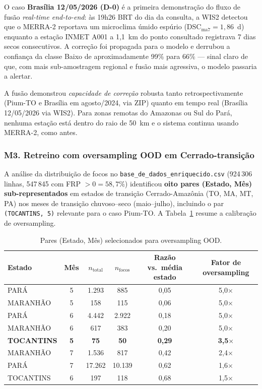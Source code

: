 O caso \textbf{Brasília 12/05/2026 (D-0)} é a primeira demonstração do fluxo de fusão \emph{real-time end-to-end}: às 19h26 BRT do dia da consulta, a WIS2 detectou que o MERRA-2 reportava um microclima úmido espúrio (DSC$_{\text{ma7}}=1{,}86$~d) enquanto a estação INMET A001 a 1,1~km do ponto consultado registrava 7 dias secos consecutivos. A correção foi propagada para o modelo e derrubou a confiança da classe Baixo de aproximadamente 99\% para 66\% --- sinal claro de que, com mais sub-amostragem regional e fusão mais agressiva, o modelo passaria a alertar.

A fusão demonstrou \emph{capacidade de correção} robusta tanto retrospectivamente (Pium-TO e Brasília em agosto/2024, via ZIP) quanto em tempo real (Brasília 12/05/2026 via WIS2). Para zonas remotas do Amazonas ou Sul do Pará, nenhuma estação está dentro do raio de 50~km e o sistema continua usando MERRA-2, como antes.

\subsubsection*{M3. Retreino com oversampling OOD em Cerrado-transição}

A análise da distribuição de focos no \texttt{base\_de\_dados\_enriquecido.csv} (924\,306 linhas, 547\,845 com FRP $> 0 = 58{,}7\%$) identificou \textbf{oito pares (Estado, Mês) sub-representados} em estados de transição Cerrado-Amazônia (TO, MA, MT, PA) nos meses de transição chuvoso--seco (maio--julho), incluindo o par \texttt{(TOCANTINS, 5)} relevante para o caso Pium-TO. A Tabela~\ref{tab:pium_ood_alvos} resume a calibração de oversampling.

\begin{table}[h]
\centering
\caption{Pares (Estado, Mês) selecionados para oversampling OOD.}
\label{tab:pium_ood_alvos}
\small
\begin{tabular}{lccccc}
\toprule
\textbf{Estado} & \textbf{Mês} & \textbf{$n_\text{total}$} & \textbf{$n_\text{focos}$} & \textbf{Razão vs.~média estado} & \textbf{Fator de oversampling} \\
\midrule
PARÁ & 5 & 1.293 & 885 & 0,05 & 5,0$\times$ \\
MARANHÃO & 5 & 158 & 115 & 0,06 & 5,0$\times$ \\
PARÁ & 6 & 4.442 & 2.922 & 0,18 & 5,0$\times$ \\
MARANHÃO & 6 & 617 & 383 & 0,20 & 5,0$\times$ \\
\textbf{TOCANTINS} & \textbf{5} & \textbf{75} & \textbf{50} & \textbf{0,29} & \textbf{3,5$\times$} \\
MARANHÃO & 7 & 1.536 & 817 & 0,42 & 2,4$\times$ \\
PARÁ & 7 & 17.262 & 10.139 & 0,62 & 1,6$\times$ \\
TOCANTINS & 6 & 197 & 118 & 0,68 & 1,5$\times$ \\
\bottomrule
\end{tabular}
\end{table}

